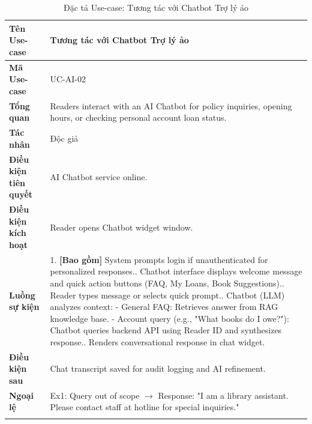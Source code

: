 \newpage
\begin{longtable}{|p{3.5cm}|p{11.5cm}|}
    \hline
    \textbf{Tên Use-case} & \textbf{Tương tác với Chatbot Trợ lý ảo} \\
    \hline
    \textbf{Mã Use-case} & UC-AI-02 \\
    \hline
    \textbf{Tổng quan} & Readers interact with an AI Chatbot for policy inquiries, opening hours, or checking personal account loan status. \\
    \hline
    \textbf{Tác nhân} & Độc giả \\
    \hline
    \textbf{Điều kiện tiên quyết} & AI Chatbot service online. \\
    \hline
    \textbf{Điều kiện kích hoạt} & Reader opens Chatbot widget window. \\
    \hline
    \textbf{Luồng sự kiện} & 
    1. \textbf{[Bao gồm]} System prompts login if unauthenticated for personalized responses.\newline
    2. Chatbot interface displays welcome message and quick action buttons (FAQ, My Loans, Book Suggestions).\newline
    3. Reader types message or selects quick prompt.\newline
    4. Chatbot (LLM) analyzes context:\newline
    - General FAQ: Retrieves answer from RAG knowledge base.\newline
    - Account query (e.g., "What books do I owe?"): Chatbot queries backend API using Reader ID and synthesizes response.\newline
    5. Renders conversational response in chat widget. \\
    \hline
    \textbf{Điều kiện sau} & Chat transcript saved for audit logging and AI refinement. \\
    \hline
    \textbf{Ngoại lệ} & 
    Ex1: Query out of scope $\rightarrow$ Response: "I am a library assistant. Please contact staff at hotline for special inquiries." \\
    \hline
    \caption{Đặc tả Use-case: Tương tác với Chatbot Trợ lý ảo}
\end{longtable}

